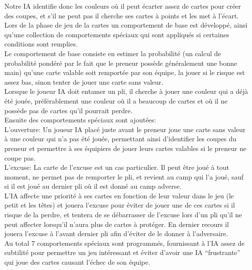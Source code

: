\documentclass[a4paper]{report}
\begin{document}
Notre IA identifie donc les couleurs où il peut écarter assez de cartes pour créer des coupes, et s’il ne peut pas il cherche ses cartes à points et les met à l’écart.\\


Lors de la phase de jeu de la cartes un comportement de base est développé, ainsi qu’une collection de comportements spéciaux qui sont appliqués si certaines conditions sont remplies.\\

Le comportement de base consiste en estimer la probabilité (un calcul de probabilité pondéré par le fait que le preneur possède généralement une bonne main) qu’une carte valable soit remportée par son équipe, la jouer si le risque est assez bas, sinon tenter de jouer une carte sans valeur.\\
Lorsque le joueur IA doit entamer un pli, il cherche à jouer une couleur qui a déjà été jouée, préférablement une couleur où il a beaucoup de cartes et où il ne possède pas de cartes qu’il pourrait perdre.\\

Ensuite des comportements spéciaux sont ajoutées:\\
L’ouverture: Un joueur IA placé juste avant le preneur joue une carte sans valeur à une couleur qui n’a pas été jouée, permettant ainsi d’identifier les coupes du preneur et permettre à ses équipiers de jouer leurs cartes valables si le preneur ne coupe pas.\\

L’excuse: La carte de l’excuse est un cas particulier. Il peut être joué à tout moment, ne permet pas de remporter le pli, et revient au camp qui l’a joué, sauf si il est joué au dernier pli où il est donné au camp adverse.\\
L’IA affecte une priorité à ses cartes en fonction de leur valeur dans le jeu (le petit et les têtes) et jouera l’excuse pour éviter de jouer une de ces cartes si il risque de la perdre, et tentera de se débarrasser de l’excuse lors d’un pli qu’il ne peut affecter lorsqu’il n’aura plus de cartes à protéger. En dernier recours il jouera l’excuse à l’avant dernier pli afin d’éviter de le donner à l’adversaire.\\

Au total 7 comportements spéciaux sont programmés, fournissant à l’IA assez de subtilité pour permettre un jeu intéressant et éviter d’avoir une IA “frustrante” qui joue des cartes causant l'échec de son équipe.\\
\end{document}
